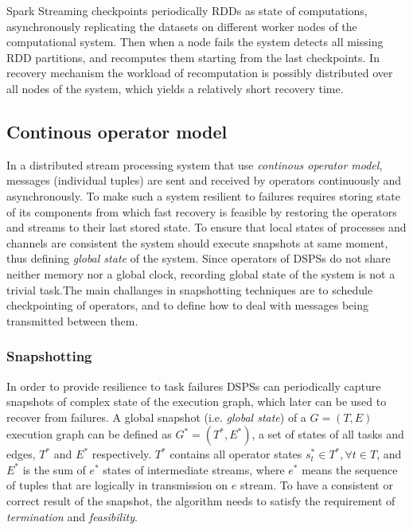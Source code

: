 Spark Streaming checkpoints periodically RDDs as state of computations, asynchronously replicating the datasets on different worker nodes of the computational system. Then when a node fails the system detects all missing RDD partitions, and recomputes them starting from the last checkpoints. In recovery mechanism the workload of recomputation is possibly distributed over all nodes of the system, which yields a relatively short recovery time.


\subsection{Continous operator model}

In a distributed stream processing system that use \textit{continous operator model},  messages (individual tuples) are sent and received by operators continuously and asynchronously. To make such a system resilient to failures requires storing state of its components from which fast recovery is feasible by restoring the operators and streams to their last stored state. To ensure that local states of processes and channels are consistent the system should execute snapshots at same moment, thus defining  \textit{global state} of the system.
 Since operators of DSPSs do not share neither memory nor a global clock, recording global state of the system is not a trivial task.The main challanges in snapshotting techniques are to schedule checkpointing of operators, and to define how to deal with messages being transmitted between them. 
\cite{introsnapshot}
\subsubsection{Snapshotting}\label{snapshotting}
In order to provide resilience to task failures DSPSs can periodically capture snapshots of complex state of the execution graph, which later can be used to recover from failures. A global snapshot\cite{abs} (i.e. \textit{global state}) of a $G = (T,E)$ execution graph can be defined as $G^{*} = (T^{*},E^{*})$, a set of states of all tasks and edges, $T^{*}$ and $E^{*}$ respectively. $T^{*}$ contains all operator states $s^{*}_{t} \in T^{*}, \forall t \in T$, and $E^{*}$ is the sum of $e^{*}$ states of intermediate streams, where $e^{*}$ means the sequence of tuples that are logically in transmission on $e$ stream. To have a consistent or correct result of the snapshot, the algorithm needs to satisfy the requirement of \textit{termination} and \textit{feasibility}.

